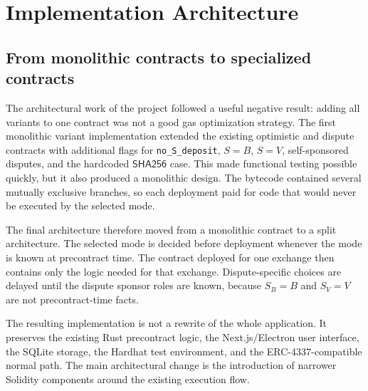 \chapter{Implementation Architecture}
\label{chap:architecture}

\section{From monolithic contracts to specialized contracts}

The architectural work of the project followed a useful negative result: adding all variants
to one contract was not a good gas optimization strategy. The first monolithic variant implementation
extended the existing optimistic and dispute contracts with additional flags for
\texttt{no\_S\_deposit}, \(S=B\), \(S=V\), self-sponsored disputes, and the hardcoded
\(\mathsf{SHA256}\) case. This made functional testing possible quickly, but it also produced
a monolithic design. The bytecode contained several mutually exclusive branches, so each
deployment paid for code that would never be executed by the selected mode.

The final architecture therefore moved from a monolithic contract to a split architecture.
The selected mode is decided before deployment whenever the mode is known at precontract
time. The contract deployed for one exchange then contains only the logic needed for that
exchange. Dispute-specific choices are delayed until the dispute sponsor roles are known,
because \(S_B=B\) and \(S_V=V\) are not precontract-time facts.

The resulting implementation is not a rewrite of the whole application. It preserves the
existing Rust precontract logic, the Next.js/Electron user interface, the SQLite storage, the
Hardhat test environment, and the ERC-4337-compatible normal path. The main architectural
change is the introduction of narrower Solidity components around the existing execution
flow.

